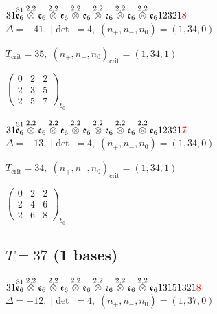 \documentclass[10pt]{article}
\begin{document}
$31\overset{31}{\mathfrak{e}_6}\overset{2,2}{\otimes}\mathfrak{e}_6\overset{2,2}{\otimes}\mathfrak{e}_6\overset{2,2}{\otimes}\mathfrak{e}_6\overset{2,2}{\otimes}\mathfrak{e}_6\overset{2,2}{\otimes}\mathfrak{e}_6\overset{2,2}{\otimes}\mathfrak{e}_612321\textcolor{red}{8}$ \quad $\Delta=-41,\; |\det|=4,\; (n_+,n_-,n_0)=(1,34,0)$

\hspace{1em}$T_{\text{crit}}=35,\; (n_+,n_-,n_0)_{\text{crit}}=(1,34,1)$

\hspace{2em}$\left(\begin{smallmatrix}0 & 2 & 2 \\ 2 & 3 & 5 \\ 2 & 5 & 7\end{smallmatrix}\right)_{\!b_0}$

$31\overset{31}{\mathfrak{e}_6}\overset{2,2}{\otimes}\mathfrak{e}_6\overset{2,2}{\otimes}\mathfrak{e}_6\overset{2,2}{\otimes}\mathfrak{e}_6\overset{2,2}{\otimes}\mathfrak{e}_6\overset{2,2}{\otimes}\mathfrak{e}_6\overset{2,2}{\otimes}\mathfrak{e}_612321\textcolor{red}{7}$ \quad $\Delta=-13,\; |\det|=4,\; (n_+,n_-,n_0)=(1,34,0)$

\hspace{1em}$T_{\text{crit}}=34,\; (n_+,n_-,n_0)_{\text{crit}}=(1,34,1)$

\hspace{2em}$\left(\begin{smallmatrix}0 & 2 & 2 \\ 2 & 4 & 6 \\ 2 & 6 & 8\end{smallmatrix}\right)_{\!b_0}$


\subsection*{$T = 37$ \quad (1 bases)}
\smallskip

$31\overset{31}{\mathfrak{e}_6}\overset{2,2}{\otimes}\mathfrak{e}_6\overset{2,2}{\otimes}\mathfrak{e}_6\overset{2,2}{\otimes}\mathfrak{e}_6\overset{2,2}{\otimes}\mathfrak{e}_6\overset{2,2}{\otimes}\mathfrak{e}_6\overset{2,2}{\otimes}\mathfrak{e}_613151321\textcolor{red}{8}$ \quad $\Delta=-12,\; |\det|=4,\; (n_+,n_-,n_0)=(1,37,0)$
\end{document}

